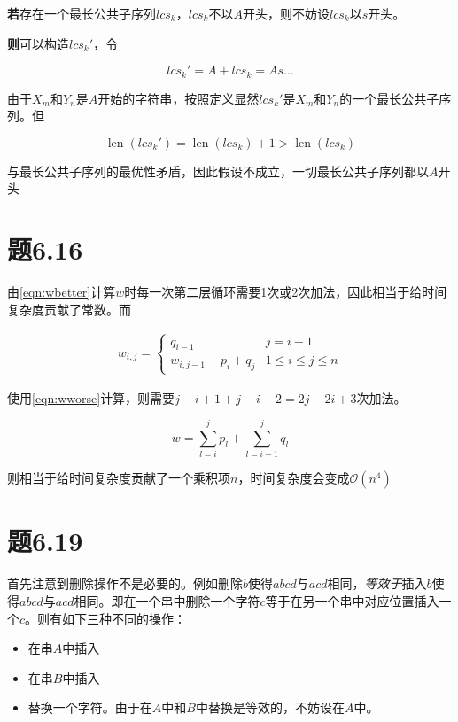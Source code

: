 \documentclass[a4paper,twoside]{article}
\begin{document}
\begin{spacing}{1.2}
\textbf{若}存在一个最长公共子序列${lcs}_k$，${lcs}_k$不以$A$开头，则不妨设${lcs}_k$以$s$开头。

\textbf{则}可以构造${lcs}_k'$，令

$$
{lcs}_k'=A+{lcs}_k=As\ldots
$$

由于$X_m$和$Y_n$是$A$开始的字符串，按照定义显然${lcs}_k'$是$X_m$和$Y_n$的一个最长公共子序列。但

$$
\mathop{len}({lcs}_k')=\mathop{len}({lcs}_k)+1 > \mathop{len}({lcs}_k)
$$

与最长公共子序列的最优性矛盾，因此假设不成立，一切最长公共子序列都以$A$开头

\section{题6.16}
由\eqref{eqn:wbetter}计算$w$时每一次第二层循环需要1次或2次加法，因此相当于给时间复杂度贡献了常数。而

\begin{equation}
	\label{eqn:wbetter}
	\begin{aligned}
		w_{i,j}=
		\begin{cases}
			q_{i-1} \ \ \ \ &j=i-1 \\
			w_{i,j-1}+p_i+q_j &1\le i\le j\le n
		\end{cases}
	\end{aligned}
\end{equation}

使用\eqref{eqn:wworse}计算，则需要$j-i+1+j-i+2=2j-2i+3$次加法。

\begin{equation}
	w=\sum_{l=i}^jp_l+\sum_{l=i-1}^jq_l
\end{equation}

则相当于给时间复杂度贡献了一个乘积项$n$，时间复杂度会变成$\mathcal{O}(n^4)$

\section{题6.19}

首先注意到删除操作不是必要的。例如删除$b$使得$abcd$与$acd$相同，\emph{等效于}插入$b$使得$abcd$与$acd$相同。即在一个串中删除一个字符$c$等于在另一个串中对应位置插入一个$c$。则有如下三种不同的操作：

\begin{itemize}
	\item 在串$A$中插入
	\item 在串$B$中插入
	\item 替换一个字符。由于在$A$中和$B$中替换是等效的，不妨设在$A$中。
\end{itemize}


\end{spacing}
\end{document}
